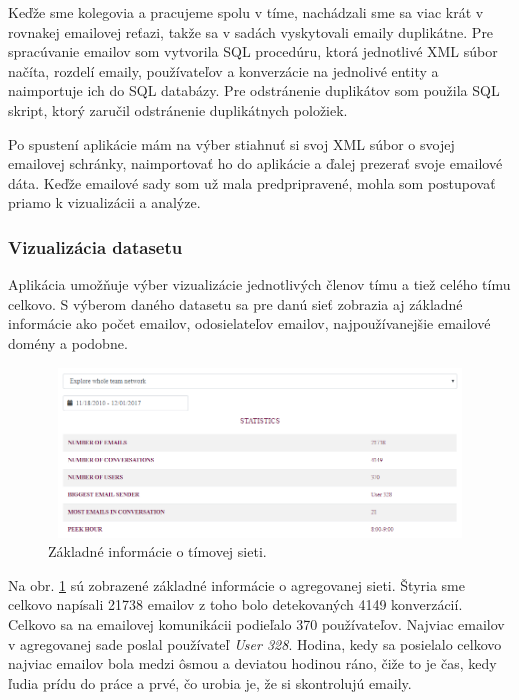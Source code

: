 \documentclass[slovak,master,public,dept460,male,cpdeclaration,oneside]{diploma}
\begin{document}
Keďže sme kolegovia a pracujeme spolu v tíme, nachádzali sme sa viac krát v rovnakej emailovej reťazi, takže sa v sadách vyskytovali emaily duplikátne. Pre spracúvanie emailov som vytvorila SQL procedúru, ktorá jednotlivé XML súbor načíta, rozdelí emaily, používateľov a konverzácie na jednolivé entity a naimportuje ich do SQL databázy. Pre odstránenie duplikátov som použila SQL skript, ktorý zaručil odstránenie duplikátnych položiek. 

Po spustení aplikácie mám na výber stiahnuť si svoj XML súbor o svojej emailovej schránky, naimportovať ho do aplikácie a ďalej prezerať svoje emailové dáta. Keďže emailové sady som už mala predpripravené, mohla som postupovať priamo k vizualizácii a analýze.



\subsubsection{Vizualizácia datasetu}
Aplikácia umožňuje výber vizualizácie jednotlivých členov tímu a tiež celého tímu celkovo. S výberom daného datasetu sa pre danú sieť zobrazia aj základné informácie ako počet emailov, odosielateľov emailov, najpoužívanejšie emailové domény a podobne.


\begin{figure}[H]
\centering
\includegraphics[width=12cm, height=4.5cm]{figures/team_tab_celkovo}
\caption{Základné informácie o tímovej sieti.}
\label{team_tab_celkovo}
\end{figure}

Na obr. \ref{team_tab_celkovo} sú zobrazené základné informácie o agregovanej sieti. Štyria sme celkovo napísali 21738 emailov z toho bolo detekovaných 4149 konverzácií. Celkovo sa na emailovej komunikácii podieľalo 370 používateľov. Najviac emailov v agregovanej sade poslal používateľ \textit{User 328}. Hodina, kedy sa posielalo celkovo najviac emailov bola medzi ôsmou a deviatou hodinou ráno, čiže to je čas, kedy ľudia prídu do práce a prvé, čo urobia je, že si skontrolujú emaily. 
\end{document}
